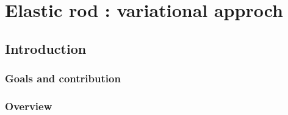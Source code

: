 \chapter{Elastic rod : variational approch}

\section{Introduction}

\subsection{Goals and contribution}

%

\subsection{Overview}

% 
%
